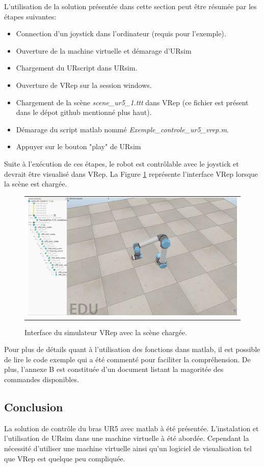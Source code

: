 \documentclass[root.tex]{subfiles}
\begin{document}
L'utilisation de la solution présentée dans cette section peut être résumée par les étapes suivantes:

\begin{itemize}
\item Connection d'un joystick dans l'ordinateur (requis pour l'exemple).
\item Ouverture de la machine virtuelle et démarage d'URsim
\item Chargement du URscript dans URsim.
\item Ouverture de VRep sur la session windows.
\item Chargement de la scène \textit{scene\_ur5\_1.ttt} dans VRep (ce fichier est présent dans le dépot github mentionné plus haut).
\item Démarage du script matlab nommé \textit{Exemple\_controle\_ur5\_vrep.m}.
\item Appuyer sur le bouton "play" de URsim
\end{itemize}

Suite à l'exécution de ces étapes, le robot est contrôlable avec le joystick et devrait être visualisé dans VRep. La Figure \ref{fig:vrep_scene} représente l'interface VRep lorsque la scène est chargée.
\begin{figure}
 \begin{center}
  \begin{tabular}{c}
    \includegraphics[trim=0cm 0cm 0cm 0cm, scale=0.25]{vrep_ur.png}
  \end{tabular}
 \end{center}
\caption{Interface du simulateur VRep avec la scène chargée.}
 \label{fig:vrep_scene}
\end{figure}
Pour plus de détails quant à l'utilisation des fonctions dans matlab, il est possible de lire le code exemple qui a été commenté pour faciliter la compréhension. De plus, l'annexe B est constituée d'un document listant la magoritée des commandes disponibles.

\subsection{Conclusion}

La solution de contrôle du bras UR5 avec matlab à été présentée.
L'instalation et l'utilisation de URsim dans une machine virtuelle à été abordée.
Cependant la nécessité d'utiliser une machine virtuelle ainsi qu'un logiciel de visualisation tel que VRep est quelque peu compliquée.


\newpage
\end{document}
